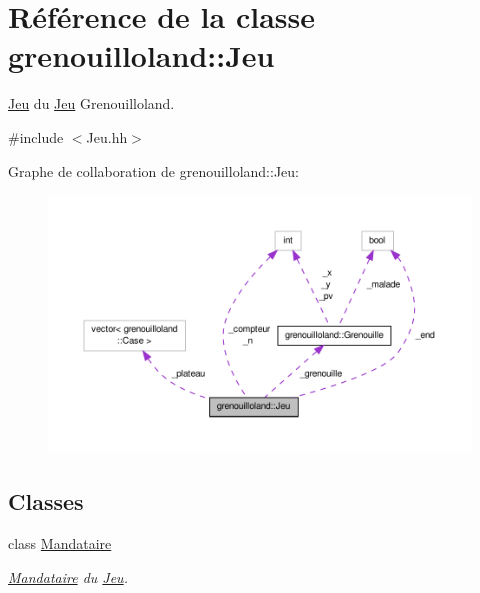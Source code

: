 \hypertarget{classgrenouilloland_1_1Jeu}{\section{Référence de la classe grenouilloland\-:\-:Jeu}
\label{classgrenouilloland_1_1Jeu}
}


\hyperlink{classgrenouilloland_1_1Jeu}{Jeu} du \hyperlink{classgrenouilloland_1_1Jeu}{Jeu} Grenouilloland.  




{\ttfamily \#include $<$Jeu.\-hh$>$}



Graphe de collaboration de grenouilloland\-:\-:Jeu\-:
\nopagebreak
\begin{figure}[H]
\begin{center}
\leavevmode
\includegraphics[width=350pt]{classgrenouilloland_1_1Jeu__coll__graph}
\end{center}
\end{figure}
\subsection*{Classes}
\begin{DoxyCompactItemize}
\item 
class \hyperlink{classgrenouilloland_1_1Jeu_1_1Mandataire}{Mandataire}
\begin{DoxyCompactList}\small\item\em \hyperlink{classgrenouilloland_1_1Jeu_1_1Mandataire}{Mandataire} du \hyperlink{classgrenouilloland_1_1Jeu}{Jeu}. \end{DoxyCompactList}\end{DoxyCompactItemize}
